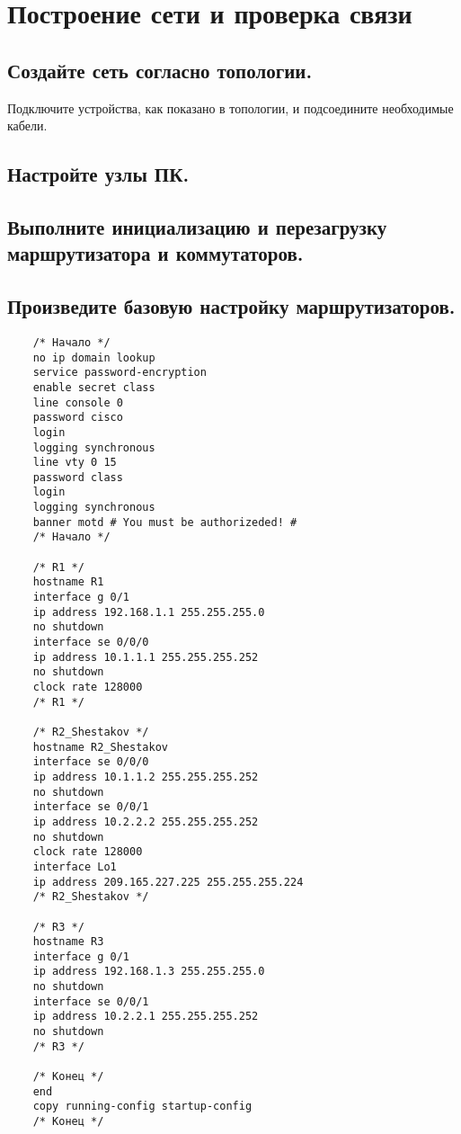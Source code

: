 \section{Построение сети и проверка связи}
\subsection{Создайте сеть согласно топологии.}
Подключите устройства, как показано в топологии, и подсоедините необходимые кабели.

\subsection{Настройте узлы ПК.}

\subsection{ Выполните инициализацию и перезагрузку маршрутизатора и коммутаторов. }



\subsection{Произведите базовую настройку маршрутизаторов.}

\begin{verbatim}
    /* Начало */
    no ip domain lookup
    service password-encryption
    enable secret class
    line console 0
    password cisco
    login
    logging synchronous
    line vty 0 15
    password class
    login
    logging synchronous
    banner motd # You must be authorizeded! #
    /* Начало */

    /* R1 */
    hostname R1
    interface g 0/1
    ip address 192.168.1.1 255.255.255.0
    no shutdown
    interface se 0/0/0
    ip address 10.1.1.1 255.255.255.252
    no shutdown
    clock rate 128000
    /* R1 */

    /* R2_Shestakov */
    hostname R2_Shestakov
    interface se 0/0/0
    ip address 10.1.1.2 255.255.255.252
    no shutdown
    interface se 0/0/1
    ip address 10.2.2.2 255.255.255.252
    no shutdown
    clock rate 128000
    interface Lo1
    ip address 209.165.227.225 255.255.255.224
    /* R2_Shestakov */

    /* R3 */
    hostname R3
    interface g 0/1
    ip address 192.168.1.3 255.255.255.0
    no shutdown
    interface se 0/0/1
    ip address 10.2.2.1 255.255.255.252
    no shutdown
    /* R3 */

    /* Конец */
    end
    copy running-config startup-config
    /* Конец */
\end{verbatim}

